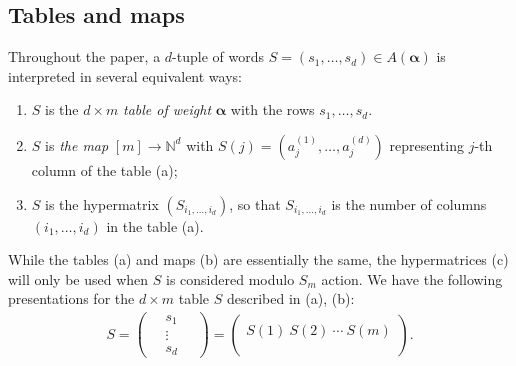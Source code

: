 \documentclass[12pt, reqno]{amsart}
\theoremstyle{definition}
\let\oldbigwedge\bigwedge
\renewcommand{\bigwedge}{
  \mathop{
    \vcenter{
      \hbox{\scalebox{0.9}{$\displaystyle\oldbigwedge$}}
    }
  }
}
\begin{document}
\subsection{Tables and maps}\label{subsec:convention} Throughout the paper, a $d$-tuple of words $S = (s_1,\ldots,s_d) \in A(\pmb{\alpha})$ is interpreted in several equivalent ways:
\begin{enumerate}
    \item[(a)] $S$ is the $d \times m$ \textit{table of weight} $\pmb{\alpha}$ with the rows $s_1,\ldots,s_d$. %
    \item[(b)] $S$ is \textit{the map} $[m] \to \mathbb{N}^d$ with $S(j) = (a^{(1)}_j,\ldots,a^{(d)}_j)$ representing $j$-th column of the table (a);
    \item[(c)] $S$ is the hypermatrix $(S_{i_1,\ldots, i_d})$, so that $S_{i_1,\ldots,i_d}$ is the number of columns $(i_1,\ldots,i_d)$ in the table (a).
\end{enumerate}
While the tables (a) and maps (b) are essentially the same, the hypermatrices (c) will only be used when $S$ is considered modulo $S_m$ action.
We have the following presentations for the $d \times m$ table $S$ described in (a), (b): 
\begin{align*}
    S = \begin{pmatrix}
        \quad s_1 \quad  \\
        \quad \vdots \quad \\
        \quad  s_d \quad
    \end{pmatrix}
    = 
    \begin{pmatrix}
        \\    %
        S(1) \ S(2) \ \cdots \ S(m)\\   %
        \\   %
    \end{pmatrix}.
\end{align*}
    
\end{document}
